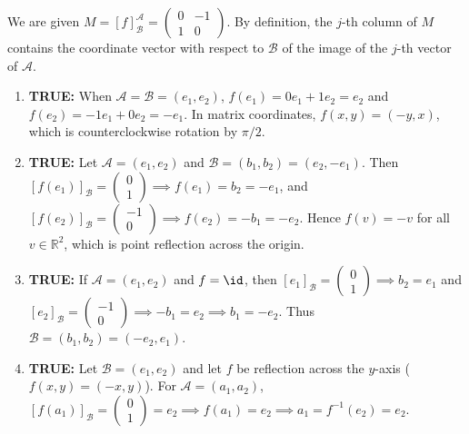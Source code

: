 \begin{exercisesolution*}
\label{sol:geometric_interpretation_matrix_mc}
We are given $M = [f]_{\mathcal{B}}^{\mathcal{A}} = \left(\begin{smallmatrix} 0 & -1 \\ 1 & 0 \end{smallmatrix}\right)$. By definition, the $j$-th column of $M$ contains the coordinate vector with respect to $\mathcal{B}$ of the image of the $j$-th vector of $\mathcal{A}$.

\begin{enumerate}[label=\textbf{(\alph*)}]
    \item \textbf{TRUE:} When $\mathcal{A} = \mathcal{B} = (e_1, e_2)$, $f(e_1) = 0 e_1 + 1 e_2 = e_2$ and $f(e_2) = -1 e_1 + 0 e_2 = -e_1$. In matrix coordinates, $f(x, y) = (-y, x)$, which is counterclockwise rotation by $\pi/2$.
    \item \textbf{TRUE:} Let $\mathcal{A} = (e_1, e_2)$ and $\mathcal{B} = (b_1, b_2) = (e_2, -e_1)$.
    Then $[f(e_1)]_{\mathcal{B}} = \left(\begin{smallmatrix} 0 \\ 1 \end{smallmatrix}\right) \implies f(e_1) = b_2 = -e_1$, and $[f(e_2)]_{\mathcal{B}} = \left(\begin{smallmatrix} -1 \\ 0 \end{smallmatrix}\right) \implies f(e_2) = -b_1 = -e_2$.
    Hence $f(v) = -v$ for all $v \in \mathbb{R}^2$, which is point reflection across the origin.
    \item \textbf{TRUE:} If $\mathcal{A} = (e_1, e_2)$ and $f = \id$, then $[e_1]_{\mathcal{B}} = \left(\begin{smallmatrix} 0 \\ 1 \end{smallmatrix}\right) \implies b_2 = e_1$ and $[e_2]_{\mathcal{B}} = \left(\begin{smallmatrix} -1 \\ 0 \end{smallmatrix}\right) \implies -b_1 = e_2 \implies b_1 = -e_2$.
    Thus $\mathcal{B} = (b_1, b_2) = (-e_2, e_1)$.
    \item \textbf{TRUE:} Let $\mathcal{B} = (e_1, e_2)$ and let $f$ be reflection across the $y$-axis ($f(x, y) = (-x, y)$).
    For $\mathcal{A} = (a_1, a_2)$, $[f(a_1)]_{\mathcal{B}} = \left(\begin{smallmatrix} 0 \\ 1 \end{smallmatrix}\right) = e_2 \implies f(a_1) = e_2 \implies a_1 = f^{-1}(e_2) = e_2$.

\end{enumerate}
\end{exercisesolution*}
